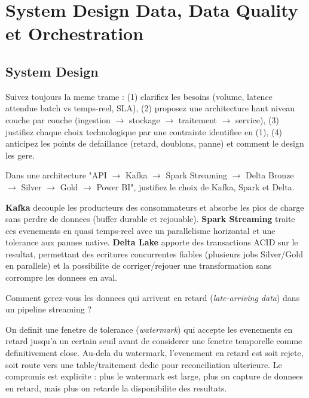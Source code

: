 \documentclass[11pt,a4paper]{article}
\begin{document}
\newpage
\section{System Design Data, Data Quality et Orchestration}

\subsection{System Design}

\begin{cle}
Suivez toujours la meme trame : (1) clarifiez les besoins (volume, latence attendue batch vs temps-reel, SLA), (2) proposez une architecture haut niveau couche par couche (ingestion $\to$ stockage $\to$ traitement $\to$ service), (3) justifiez chaque choix technologique par une contrainte identifiee en (1), (4) anticipez les points de defaillance (retard, doublons, panne) et comment le design les gere.
\end{cle}

\begin{question} Dans une architecture "API $\to$ Kafka $\to$ Spark Streaming $\to$ Delta Bronze $\to$ Silver $\to$ Gold $\to$ Power BI", justifiez le choix de Kafka, Spark et Delta.
\end{question}
\begin{reponse}
\textbf{Kafka} decouple les producteurs des consommateurs et absorbe les pics de charge sans perdre de donnees (buffer durable et rejouable). \textbf{Spark Streaming} traite ces evenements en quasi temps-reel avec un parallelisme horizontal et une tolerance aux pannes native. \textbf{Delta Lake} apporte des transactions ACID sur le resultat, permettant des ecritures concurrentes fiables (plusieurs jobs Silver/Gold en parallele) et la possibilite de corriger/rejouer une transformation sans corrompre les donnees en aval.
\end{reponse}

\begin{question} Comment gerez-vous les donnees qui arrivent en retard (\emph{late-arriving data}) dans un pipeline streaming ?
\end{question}
\begin{reponse}
On definit une fenetre de tolerance (\emph{watermark}) qui accepte les evenements en retard jusqu'a un certain seuil avant de considerer une fenetre temporelle comme definitivement close. Au-dela du watermark, l'evenement en retard est soit rejete, soit route vers une table/traitement dedie pour reconciliation ulterieure. Le compromis est explicite : plus le watermark est large, plus on capture de donnees en retard, mais plus on retarde la disponibilite des resultats.
\end{reponse}
\end{document}
